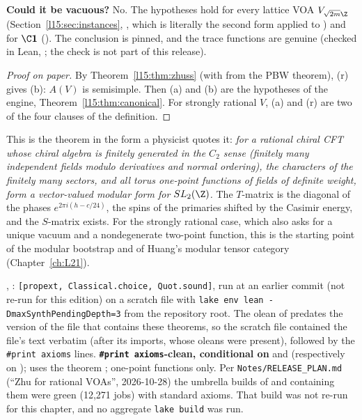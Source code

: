 \begin{dictionary}
\textbf{Could it be vacuous?} No. The hypotheses hold for every lattice VOA $V_{\sqrt{2m}\Z}$ (Section~\ref{l15:sec:instances},
, which is literally the second form applied to ) and for $\C\lfifteenvac$
(). The conclusion is pinned, and the trace functions are genuine (checked in Lean,
\allowbreak{}; the check is not part of this release).
\end{dictionary}

\begin{proof}[Proof on paper]
By Theorem~\ref{l15:thm:zhuss} (with  from the PBW theorem), (r) gives (b): $A(V)$ is semisimple. Then (a) and (b) are
the hypotheses of the engine, Theorem~\ref{l15:thm:canonical}. For strongly rational $V$, (a) and (r) are two of the four
clauses of the definition.
\end{proof}

\begin{physics}
This is the theorem in the form a physicist quotes it: \emph{for a rational chiral CFT whose chiral algebra is finitely
generated in the $C_2$ sense (finitely many independent fields modulo derivatives and normal ordering), the characters of the
finitely many sectors, and all torus one-point functions of fields of definite weight, form a vector-valued modular form for
$\lfifteenSL$.} The $T$-matrix is the diagonal of the phases $e^{2\pi i(h-c/24)}$, the spins of the primaries shifted by the
Casimir energy, and the $S$-matrix exists. For the strongly rational case, which also asks for a unique vacuum and a
nondegenerate two-point function, this is the starting point of the modular bootstrap and of Huang's modular tensor category
(Chapter~\ref{ch:L21}).
\end{physics}

\begin{status}
\allowbreak{}\allowbreak{}\allowbreak{},
\allowbreak{}\allowbreak{}: \texttt{[propext, Classical.choice,
Quot.sound]}, run at an earlier commit (not re-run for this edition) on a scratch file with \texttt{lake env lean -DmaxSynthPendingDepth=3} from the
repository root. The olean of  predates the version of the file that contains these
theorems, so the scratch file contained the file's text verbatim (after its imports, whose oleans were present), followed by
the \texttt{\#print axioms} lines. \textbf{\texttt{\#print axioms}-clean, conditional on}  and
 (respectively on ); uses the theorem ; one-point functions
only. Per \texttt{Notes/RELEASE\_PLAN.md} (``Zhu for rational VOAs'', 2026-10-28) the umbrella builds of
 and  containing them were green (12,271 jobs) with standard axioms. That build
was not re-run for this chapter, and no aggregate \texttt{lake build} was run.
\end{status}

